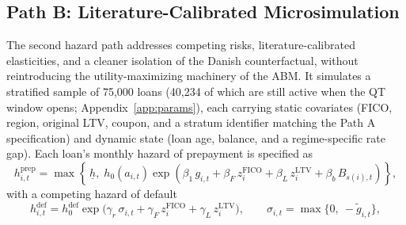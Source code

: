 \documentclass[12pt]{article}
\begin{document}
\subsection{Path B: Literature-Calibrated Microsimulation}\label{sec:pathb}

The second hazard path addresses competing risks, literature-calibrated elasticities, and a cleaner isolation of the Danish counterfactual, without reintroducing the utility-maximizing machinery of the ABM. It simulates a stratified sample of 75,000 loans (40,234 of which are still active when the QT window opens; Appendix~\ref{app:params}), each carrying static covariates (FICO, region, original LTV, coupon, and a stratum identifier matching the Path A specification) and dynamic state (loan age, balance, and a regime-specific rate gap). Each loan's monthly hazard of prepayment is specified as
\begin{equation}\label{eq:pathB}
h^{\mathrm{prep}}_{i,t} = \max\!\left\{\, \underline{h},\; h_0\!\left(a_{i,t}\right) \exp\!\left( \beta_1\, g_{i,t} + \beta_F\, z^{\mathrm{FICO}}_{i} + \beta_L\, z^{\mathrm{LTV}}_{i} + \beta_b\, B_{s(i),t} \right) \right\},
\end{equation}
with a competing hazard of default
\begin{equation}\label{eq:default}
h^{\mathrm{def}}_{i,t} = h^{\mathrm{def}}_0 \exp\!\big( \gamma_r\, \sigma_{i,t} + \gamma_F\, z^{\mathrm{FICO}}_{i} + \gamma_L\, z^{\mathrm{LTV}}_{i} \big), \qquad \sigma_{i,t} = \max\{0,\ -\tilde g_{i,t}\},
\end{equation}
\end{document}
